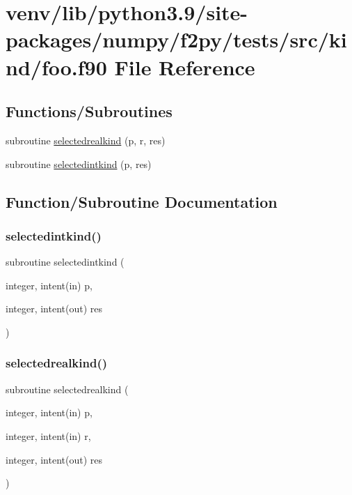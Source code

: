 \hypertarget{kind_2foo_8f90}{}\section{venv/lib/python3.9/site-\/packages/numpy/f2py/tests/src/kind/foo.f90 File Reference}
\label{kind_2foo_8f90}
\subsection*{Functions/\+Subroutines}
\begin{DoxyCompactItemize}
\item 
subroutine \hyperlink{kind_2foo_8f90_abdbf4ce86249497a145acbd5421d7fc8}{selectedrealkind} (p, r, res)
\item 
subroutine \hyperlink{kind_2foo_8f90_af9a8d38b6d0f5c1af39eebc1e5396619}{selectedintkind} (p, res)
\end{DoxyCompactItemize}


\subsection{Function/\+Subroutine Documentation}
\mbox{\label{kind_2foo_8f90_af9a8d38b6d0f5c1af39eebc1e5396619}} 
\subsubsection{\texorpdfstring{selectedintkind()}{selectedintkind()}}
{\footnotesize\ttfamily subroutine selectedintkind (\begin{DoxyParamCaption}\item[{integer, intent(in)}]{p,  }\item[{integer, intent(out)}]{res }\end{DoxyParamCaption})}

\mbox{\label{kind_2foo_8f90_abdbf4ce86249497a145acbd5421d7fc8}} 
\subsubsection{\texorpdfstring{selectedrealkind()}{selectedrealkind()}}
{\footnotesize\ttfamily subroutine selectedrealkind (\begin{DoxyParamCaption}\item[{integer, intent(in)}]{p,  }\item[{integer, intent(in)}]{r,  }\item[{integer, intent(out)}]{res }\end{DoxyParamCaption})}

